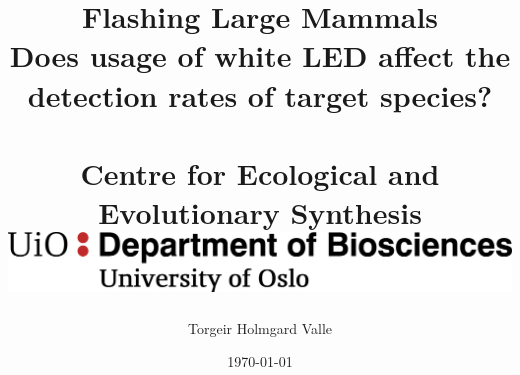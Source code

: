 \title{	
	{\large Flashing Large Mammals}\\
	{\small Does usage of white LED affect the detection rates of target species?}\\
	{~}\\
	{\large Centre for Ecological and Evolutionary Synthesis}\\
	{\includegraphics[scale=0.5]{./img/MN_IMBV_A_ENG.png}}\\
}
\author{Torgeir Holmgard Valle}
\date{\today}